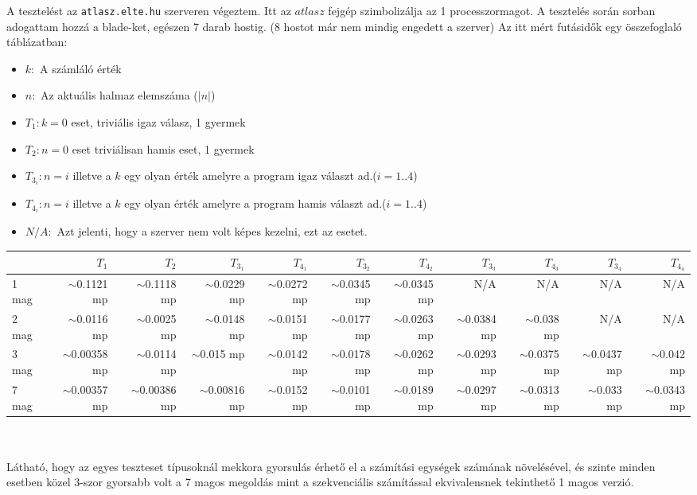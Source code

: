\documentclass[12pt]{article}
\begin{document}
A tesztelést az \verb|atlasz.elte.hu| szerveren végeztem. Itt az $atlasz$ fejgép szimbolizálja az 1 processzormagot.
A tesztelés során sorban adogattam hozzá a blade-ket, egészen 7 darab hostig. (8 hostot már nem mindig engedett a szerver)
Az itt mért futásidők egy összefoglaló táblázatban:

\begin{itemize}
	\item $k :$ A számláló érték
    \item $n :$ Az aktuális halmaz elemszáma ($|n|$)
    \item $T_1 : k = 0$ eset, triviális igaz válasz, 1 gyermek
    \item $T_2 : n = 0$ eset triviálisan hamis eset, 1 gyermek
    \item $T_{3_i} : n = i$ illetve a $k$ egy olyan érték amelyre a program igaz választ ad.($i=1..4$) 
    \item $T_{4_i} : n = i$ illetve a $k$ egy olyan érték amelyre a program hamis választ ad.($i=1..4$)
    \item $N/A :$ Azt jelenti, hogy a szerver nem volt képes kezelni, ezt az esetet.
\end{itemize}

\begin{adjustbox}{max width=\textwidth}
	\begin{tabular}{| l | r | r | r | r | r | r | r | r | r | r |}
      \hline
       & $T_1$ & $T_2$ & $T_{3_1}$ & $T_{4_1}$ & $T_{3_2}$ & $T_{4_2}$ & $T_{3_3}$ & $T_{4_3}$ & $T_{3_4}$ & $T_{4_4}$ \\ \hline
      1 mag  & $\sim$0.1121 mp & $\sim$0.1118 mp & $\sim$0.0229 mp & $\sim$0.0272 mp & $\sim$0.0345 mp & $\sim$0.0345 mp & N/A & N/A & N/A & N/A  \\ \hline
      2 mag & $\sim$0.0116 mp & $\sim$0.0025 mp & $\sim$0.0148 mp & $\sim$0.0151 mp & $\sim$0.0177 mp & $\sim$0.0263 mp & $\sim$0.0384 mp & $\sim$0.038 mp & N/A & N/A \\ \hline
      3 mag & $\sim$0.00358 mp & $\sim$0.0114 mp & $\sim$0.015 mp & $\sim$0.0142 mp & $\sim$0.0178 mp & $\sim$0.0262 mp & $\sim$0.0293 mp & $\sim$0.0375 mp & $\sim$0.0437 mp & $\sim$0.042 mp \\ \hline
      7 mag & $\sim$0.00357 mp & $\sim$0.00386 mp & $\sim$0.00816 mp & $\sim$0.0152 mp & $\sim$0.0101 mp & $\sim$0.0189 mp & $\sim$0.0297 mp & $\sim$0.0313 mp & $\sim$0.033 mp & $\sim$0.0343 mp \\
      \hline
	\end{tabular}
\end{adjustbox}
\\
\\
Látható, hogy az egyes teszteset típusoknál mekkora gyorsulás érhető el a számítási egységek számának növelésével, és szinte minden esetben közel 3-szor gyorsabb volt a 7 magos megoldás mint a szekvenciális számítással ekvivalensnek tekinthető 1 magos verzió.
\end{document}
